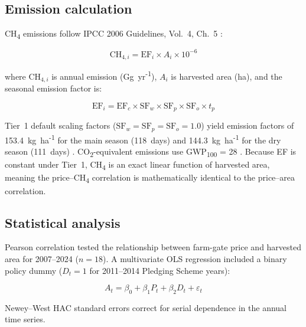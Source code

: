 \documentclass[fleqn,10pt]{olplainarticle}
\begin{document}
\subsection*{Emission calculation}

CH\textsubscript{4} emissions follow IPCC 2006 Guidelines, Vol.~4, Ch.~5
\citep{ipcc2006}:

\begin{equation}
  \text{CH}_{4,i} = \text{EF}_i \times A_i \times 10^{-6}
  \label{eq:ch4}
\end{equation}

\noindent where $\text{CH}_{4,i}$ is annual emission (Gg~yr\textsuperscript{-1}),
$A_i$ is harvested area (ha), and the seasonal emission factor is:

\begin{equation}
  \text{EF}_i = \text{EF}_c \times \text{SF}_{w} \times \text{SF}_{p}
               \times \text{SF}_{o} \times t_{p}
  \label{eq:ef}
\end{equation}

Tier~1 default scaling factors ($\text{SF}_w = \text{SF}_p = \text{SF}_o = 1.0$)
yield emission factors of 153.4~kg~ha\textsuperscript{-1} for the main season
(118~days) and 144.3~kg~ha\textsuperscript{-1} for the dry season (111~days)
\citep{buddhaboon2011}.
CO\textsubscript{2}-equivalent emissions use GWP\textsubscript{100} = 28
\citep{myhre2013}.
Because EF is constant under Tier~1, CH\textsubscript{4} is an exact linear
function of harvested area, meaning the price--CH\textsubscript{4} correlation
is mathematically identical to the price--area correlation.

\subsection*{Statistical analysis}

Pearson correlation tested the relationship between farm-gate price and
harvested area for 2007--2024 ($n = 18$).
A multivariate OLS regression included a binary policy dummy
($D_t = 1$ for 2011--2014 Pledging Scheme years):

\begin{equation}
  A_t = \beta_0 + \beta_1 P_t + \beta_2 D_t + \varepsilon_t
  \label{eq:dummy}
\end{equation}

Newey--West HAC standard errors \citep{neweywest1987} correct for serial
dependence in the annual time series.

\end{document}

